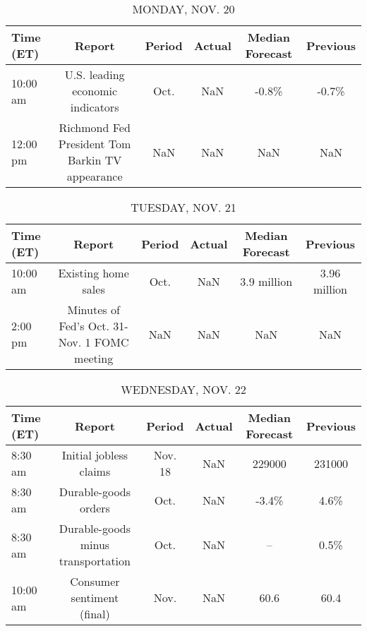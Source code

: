 \documentclass{article}%
\begin{document}
%
\normalsize%


\begin{table}[htbp]%
\caption{MONDAY, NOV. 20}%
\centering%
\begin{adjustbox}{width=1\textwidth}%
\begin{tabular}{lccccc}
\toprule
Time (ET) &                                          Report & Period & Actual & Median Forecast & Previous \\
\midrule
 10:00 am &                U.S. leading economic indicators &   Oct. &    NaN &           -0.8\% &    -0.7\% \\
 12:00 pm & Richmond Fed President Tom Barkin TV appearance &    NaN &    NaN &             NaN &      NaN \\
\bottomrule
\end{tabular}
%
\end{adjustbox}%
\end{table}

%


\begin{table}[htbp]%
\caption{TUESDAY, NOV. 21}%
\centering%
\begin{adjustbox}{width=1\textwidth}%
\begin{tabular}{lccccc}
\toprule
Time (ET) &                                       Report & Period & Actual & Median Forecast &     Previous \\
\midrule
 10:00 am &                          Existing home sales &   Oct. &    NaN &     3.9 million & 3.96 million \\
  2:00 pm & Minutes of Fed's Oct. 31-Nov. 1 FOMC meeting &    NaN &    NaN &             NaN &          NaN \\
\bottomrule
\end{tabular}
%
\end{adjustbox}%
\end{table}

%


\begin{table}[htbp]%
\caption{WEDNESDAY, NOV. 22}%
\centering%
\begin{adjustbox}{width=1\textwidth}%
\begin{tabular}{lccccc}
\toprule
Time (ET) &                             Report &  Period & Actual & Median Forecast & Previous \\
\midrule
  8:30 am &             Initial jobless claims & Nov. 18 &    NaN &          229000 &   231000 \\
  8:30 am &               Durable-goods orders &    Oct. &    NaN &           -3.4\% &     4.6\% \\
  8:30 am & Durable-goods minus transportation &    Oct. &    NaN &              -- &     0.5\% \\
 10:00 am &         Consumer sentiment (final) &    Nov. &    NaN &            60.6 &     60.4 \\
\bottomrule
\end{tabular}
%
\end{adjustbox}%
\end{table}
\end{document}
